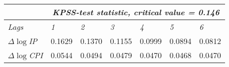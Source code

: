 \begin{table}[!htpb]
\begin{adjustbox}{max width=\textwidth}
\begin{tabular}{@{}lllllll@{}}
& \multicolumn{6}{c}{\textit{KPSS-test statistic, critical value = 0.146}}  \\ \midrule
\textit{Lags}                  & \textit{1}                     & \textit{2}                                            & \textit{3}                                            & \textit{4}                                            & \textit{5}                                            & \textit{6}                                                       \\ \cmidrule(l){2-7} 
$\Delta \log$\textit{IP} & \cellcolor[HTML]{FFCCC9}0.1629 & \cellcolor[HTML]{9AFF99}0.1370                        & \cellcolor[HTML]{9AFF99}0.1155                        & \cellcolor[HTML]{9AFF99}0.0999                        & \cellcolor[HTML]{9AFF99}0.0894                         & \cellcolor[HTML]{9AFF99}0.0812                        \\
$\Delta \log$\textit{CPI}             & \cellcolor[HTML]{9AFF99}0.0544 & \cellcolor[HTML]{9AFF99}0.0494                        & \cellcolor[HTML]{9AFF99}0.0479                        & \cellcolor[HTML]{9AFF99}0.0470                        & \cellcolor[HTML]{9AFF99}0.0468                        & \cellcolor[HTML]{9AFF99}0.0470                        \\

\end{tabular}
\end{adjustbox}
\end{table}

